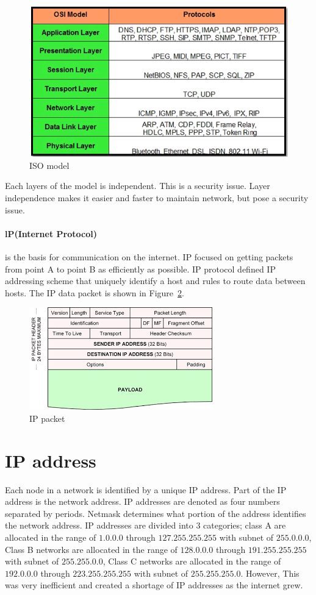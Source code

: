 \documentclass[7x9]{times}
\begin{document}
\begin{figure}
    \includegraphics[width=.75\textwidth]{2Xd2IXV}
    \caption{ISO model}
    \label{fig:iso2}
\end{figure}

Each layers of the model is independent. This is a security 
issue. Layer independence makes it easier and faster to
maintain network, but pose a security issue.

\paragraph{lP(Internet Protocol)} is the basis for
communication on the internet. IP focused on getting packets
from point A to point B as efficiently as possible. IP 
protocol defined IP addressing scheme that uniquely 
identify a host and rules to route data between hosts. The 
IP data packet is shown in Figure~\ref{fig:packet}.

\begin{figure}
    \includegraphics{packet}
    \caption{IP packet}
    \label{fig:packet}
\end{figure}

\section{IP address}

Each node in a network is identified by a unique IP address.
Part of the IP address is the network address. IP addresses
are denoted as four numbers separated by periods. Netmask
determines what portion of the address identifies the
network address. IP addresses are divided into 3 categories;
class A are allocated in the range of $1.0.0.0$ through
$127.255.255.255$ with subnet of $255.0.0.0$, Class B
networks are allocated in the range of $128.0.0.0$ through
$191.255.255.255$ with subnet of $255.255.0.0$, Class C
networks are allocated in the range of $192.0.0.0$ through
$223.255.255.255$ with subnet of $255.255.255.0$. However,
This was very inefficient and created a shortage of IP
addresses as the internet grew.
\end{document}
